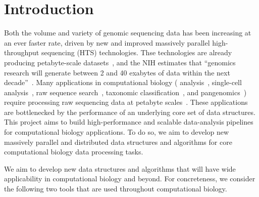 


\section{Introduction}
\label{intro}





Both the volume and variety of genomic sequencing data has been increasing at an ever faster rate, driven by new and improved massively parallel high-throughput sequencing (HTS) technologies.  Thse technologies are already producing
petabyte-scale datasets~\cite{kodama2012sequence}, and the NIH estimates that ``genomics research will generate between 2 and 40 exabytes of data within the next decade''~\cite{NHGRIDataScience}. Many applications in computational biology (\kmer
analysis~\cite{MarccaisKi11}, single-cell analysis~\cite{he2022alevin}, raw sequence search~\cite{solomon2016fast}, taxonomic classification~\cite{wood2014kraken}, and pangenomics~\cite{computational2018computational})
require processing raw sequencing data at petabyte scales~\cite{kodama2012sequence}. 
%
These applications are bottlenecked by the performance of an underlying core set of data structures. 
%
This project aims to build high-performance and scalable data-analysis pipelines for computational biology applications.
To do so, we aim to develop new massively parallel and distributed data structures and algorithms for core computational biology data processing tasks.


We aim to develop new data structures and algorithms that will have wide applicability in computational biology and beyond. For concreteness, we consider the following two tools that are used throughout computational biology.

